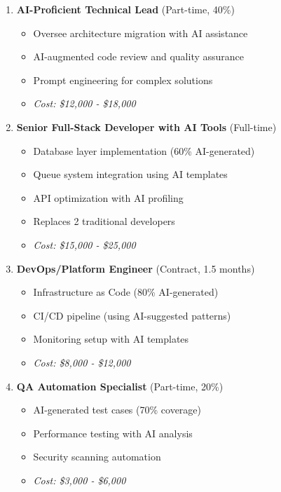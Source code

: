 \documentclass[12pt,a4paper]{report}
\begin{document}
\begin{enumerate}
    \item \textbf{AI-Proficient Technical Lead} (Part-time, 40\%)
    \begin{itemize}
        \item Oversee architecture migration with AI assistance
        \item AI-augmented code review and quality assurance
        \item Prompt engineering for complex solutions
        \item \textit{Cost: \$12,000 - \$18,000}
    \end{itemize}
    
    \item \textbf{Senior Full-Stack Developer with AI Tools} (Full-time)
    \begin{itemize}
        \item Database layer implementation (60\% AI-generated)
        \item Queue system integration using AI templates
        \item API optimization with AI profiling
        \item Replaces 2 traditional developers
        \item \textit{Cost: \$15,000 - \$25,000}
    \end{itemize}
    
    \item \textbf{DevOps/Platform Engineer} (Contract, 1.5 months)
    \begin{itemize}
        \item Infrastructure as Code (80\% AI-generated)
        \item CI/CD pipeline (using AI-suggested patterns)
        \item Monitoring setup with AI templates
        \item \textit{Cost: \$8,000 - \$12,000}
    \end{itemize}
    
    \item \textbf{QA Automation Specialist} (Part-time, 20\%)
    \begin{itemize}
        \item AI-generated test cases (70\% coverage)
        \item Performance testing with AI analysis
        \item Security scanning automation
        \item \textit{Cost: \$3,000 - \$6,000}
    \end{itemize}
\end{enumerate}
\end{document}
